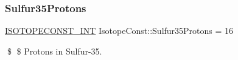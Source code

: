 \subsubsection{\texorpdfstring{Sulfur35\+Protons}{Sulfur35Protons}}
{\footnotesize\ttfamily \mbox{\hyperlink{group___isotope_const-_macros_ga5f18360b3e99483a35c32d789e62621c}{I\+S\+O\+T\+O\+P\+E\+C\+O\+N\+S\+T\+\_\+\+I\+NT}} Isotope\+Const\+::\+Sulfur35\+Protons = 16}

\$ \$ Protons in Sulfur-\/35. 